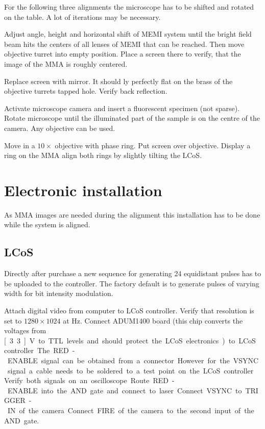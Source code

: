 \documentclass{scrartcl}
\begin{document}

For the following three alignments the microscope has to be shifted and
rotated on the table. A lot of iterations may be necessary.

 Adjust angle, height and horizontal shift of
MEMI system until the bright field beam hits the centers of all lenses
of MEMI that can be reached.  Then move objective turret into empty
position. Place a screen there to verify, that the image of the MMA is
roughly centered.

Replace screen with mirror. It should ly perfectly flat on the brass of the
objective turrets tapped hole. Verify back reflection.

 Activate microscope camera
and insert a fluorescent specimen (not sparse).  Rotate microscope
until the illuminated part of the sample is on the centre of the
camera. Any objective can be used.

 Move in a $10\times$
objective with phase ring. Put screen over objective. Display a ring
on the MMA align both rings by slightly tilting the LCoS.

\section{Electronic installation}
As MMA images are needed during the alignment this installation has to
be done while the system is aligned.

\subsection{LCoS}
Directly after purchase a new sequence for generating 24 equidistant
pulses has to be uploaded to the controller. The factory default is to
generate pulses of varying width for \unit[8]{bit} intensity
modulation.

Attach digital video from computer to LCoS controller. Verify that
resolution is set to $1280\times 1024$ at \unit[60]{Hz}. Connect
ADUM1400 board (this chip converts the voltages from \unit[3.3]{V} to
TTL levels and should protect the LCoS electronics) to LCoS
controller.  The RED-ENABLE signal can be obtained from a
connector. However for the VSYNC signal a cable needs to be soldered
to a test point on the LCoS controller.

Verify both signals on an oscilloscope. Route RED-ENABLE into the AND
gate and connect to laser. Connect VSYNC to TRIGGER-IN of the
camera. Connect FIRE of the camera to the second input of the AND
gate.
\end{document}
